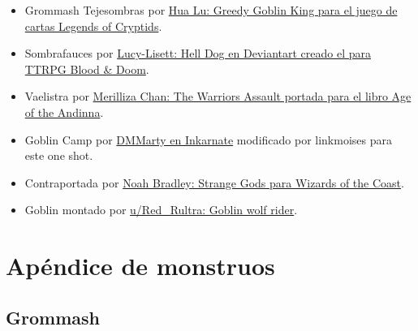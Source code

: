 \documentclass[10pt,twoside,twocolumn,openany]{dndbook}
\begin{document}
\begin{itemize}
  \item Grommash Tejesombras por \href{https://legendofthecryptids.fandom.com/wiki/Greedy_Goblin_King}{Hua Lu: Greedy Goblin King para el juego de cartas Legends of Cryptids}.
  \item Sombrafauces por \href{https://www.deviantart.com/lucy-lisett/art/Death-Dog-901248620}{Lucy-Lisett: Hell Dog en Deviantart creado el para TTRPG Blood \& Doom}.
  \item Vaelistra por \href{https://www.artstation.com/artwork/aRZ92J}{Merilliza Chan: The Warriors Assault portada para el libro Age of the Andinna}.
  \item Goblin Camp por \href{https://inkarnate.com/m/zkNwn5--goblin-camp/}{DMMarty en Inkarnate} modificado por linkmoises para este one shot.
  \item Contraportada por \href{https://www.deviantart.com/noahbradley/art/Strange-Gods-205766996}{Noah Bradley: Strange Gods para Wizards of the Coast}.
  \item Goblin montado por \href{https://www.reddit.com/r/DnDHomebrew/comments/mhwoa6/i_made_a_goblin_wolf_rider/}{u/Red\_Rultra: Goblin wolf rider}.
\end{itemize}

\part*{Apéndice de monstruos}

\chapter*{Grommash}
\end{document}
